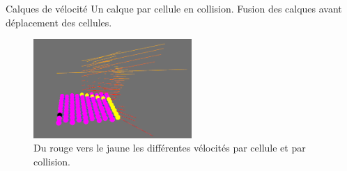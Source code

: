 \documentclass{beamer}
\begin{document}
\begin{frame}{Calques de vélocité}
  Un calque par cellule en collision. Fusion des calques avant déplacement des cellules.
  \begin{figure}
    \begin{center}
      \includegraphics[width=6cm]{Images/calque.png}
    \end{center}
    \caption{Du rouge vers le jaune les différentes vélocités par cellule et par collision.}
  \end{figure}
\end{frame}

\end{document}
